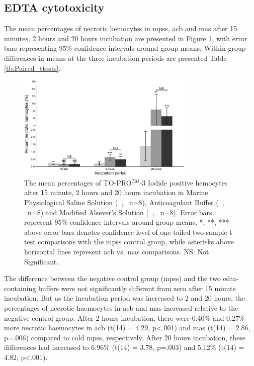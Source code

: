 \subsection{EDTA cytotoxicity}
 The mean percentages of necrotic hemocytes in \acrshort{mpss}, \acrshort{acb} and \acrshort{mas} after 15 minutes, 2 hours and 20 hours incubation are presented in Figure \ref{fig:BufferViability}, with error bars representing 95\% confidence intervals around group means. Within group differences in means at the three incubation periods are presented Table \ref{tb:Paired_ttests}.

\begin{figure}[H]
    \centering
    \includegraphics[width=0.75\textwidth]{figures/Method development/EDTA cytotoxicity.pdf}
    \caption{The mean percentages of TO-PRO$^{TM}$-3 Iodide positive hemocytes after 15 minute, 2 hours and 20 hours incubation in Marine Physiological Saline Solution (\, \protect\lysegraabox, \ n=8), Anticoagulant Buffer (\, \protect\customgraybox, \ n=8) and Modified Alsever's Solution (\, \protect\darkgraybox, \ n=8). Error bars represent 95\% confidence intervals around group means, *, **, *** above error bars denotes confidence level of one-tailed two sample t-test comparisons with the \acrshort{mpss} control group, while asterisks above horizontal lines represent \acrshort{acb} vs. \acrshort{mas} comparisons. NS: Not Significant.}
    \label{fig:BufferViability}
\end{figure}

The difference between the negative control group (\acrshort{mpss}) and the two \acrshort{edta}-containing buffers were not significantly different from zero after 15 minute incubation. But as the incubation period was increased to 2 and 20 hours, the percentages of necrotic haemocytes in \acrshort{acb} and \acrshort{mas} increased relative to the negative control group. After 2 hours incubation, there were 0.40\% and 0.27\% more necrotic haemocytes in \acrshort{acb} (t(14) = 4.29, p<.001) and \acrshort{mas} (t(14) = 2.86, p=.006) compared to cold \acrshort{mpss}, respectively. After 20 hours incubation, these differences had increased to 6.96\% (t(14) = 3.78, p=.003) and 5.12\% (t(14) = 4.82, p<.001).

